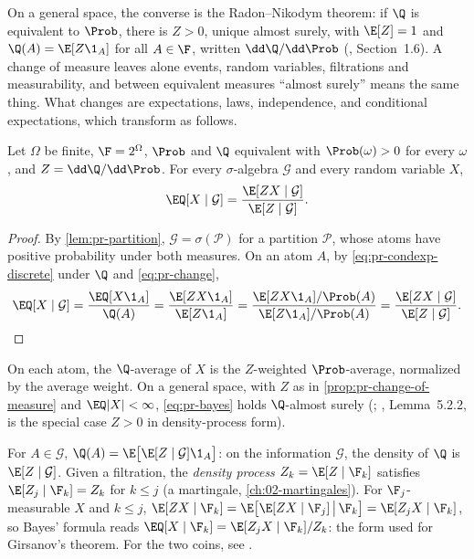 On a general space, the converse is the Radon--Nikodym theorem: if $\Q$ is equivalent to
$\Prob$, there is $Z>0$, unique almost surely, with $\E[Z]=1$ and $\Q(A)=\E[Z\1_A]$ for all
$A\in\F$, written $\dd\Q/\dd\Prob$ (\textcite{shreve2}, Section~1.6). A change of measure
leaves alone events, random variables, filtrations and measurability, and between
equivalent measures ``almost surely'' means the same thing. What changes are expectations,
laws, independence, and conditional expectations, which transform as follows.

\begin{proposition}\label{prop:pr-bayes}
Let $\Omega$ be finite, $\F=2^\Omega$, $\Prob$ and $\Q$ equivalent with $\Prob(\omega)>0$ for
every $\omega$, and $Z=\dd\Q/\dd\Prob$. For every $\sigma$-algebra $\mathcal G$ and every
random variable $X$,
\begin{equation}\label{eq:pr-bayes}
  \EQ[X\mid\mathcal G]=\frac{\E[ZX\mid\mathcal G]}{\E[Z\mid\mathcal G]} .
\end{equation}
\end{proposition}

\begin{proof}
By \cref{lem:pr-partition}, $\mathcal G=\sigma(\mathcal P)$ for a partition $\mathcal P$,
whose atoms have positive probability under both measures. On an atom $A$, by
\eqref{eq:pr-condexp-discrete} under $\Q$ and \eqref{eq:pr-change},
\[
  \EQ[X\mid\mathcal G]=\frac{\EQ[X\1_A]}{\Q(A)}=\frac{\E[ZX\1_A]}{\E[Z\1_A]}
  =\frac{\E[ZX\1_A]/\Prob(A)}{\E[Z\1_A]/\Prob(A)}=\frac{\E[ZX\mid\mathcal G]}{\E[Z\mid\mathcal G]} .
  \qedhere
\]
\end{proof}

On each atom, the $\Q$-average of $X$ is the $Z$-weighted $\Prob$-average, normalized by
the average weight. On a general space, with $Z$ as in \cref{prop:pr-change-of-measure} and
$\EQ|X|<\infty$, \eqref{eq:pr-bayes} holds $\Q$-almost surely (;
\textcite{shreve2}, Lemma~5.2.2, is the special case $Z>0$ in density-process form).

\begin{remark}\label{rem:pr-density-process}
For $A\in\mathcal G$, $\Q(A)=\E\big[\E[Z\mid\mathcal G]\1_A\big]$: on the information
$\mathcal G$, the density of $\Q$ is $\E[Z\mid\mathcal G]$. Given a filtration, the
\emph{density process} $Z_k=\E[Z\mid\F_k]$ satisfies $\E[Z_j\mid\F_k]=Z_k$ for $k\le j$ (a
martingale, \cref{ch:02-martingales}). For $\F_j$-measurable $X$ and $k\le j$,
$\E[ZX\mid\F_k]=\E\big[\E[ZX\mid\F_j]\,\big|\,\F_k\big]=\E[Z_jX\mid\F_k]$, so Bayes' formula
reads $\EQ[X\mid\F_k]=\E[Z_jX\mid\F_k]/Z_k$: the form used for Girsanov's theorem. For the
two coins, see .
\end{remark}

